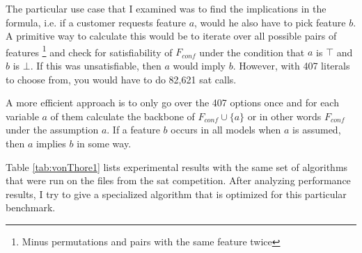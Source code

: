 The particular use case that I examined was to find the implications in the formula, i.e. if a customer requests feature $a$, would he also have to pick feature $b$. A primitive way to calculate this would be to iterate over all possible pairs of features \footnote{Minus permutations and pairs with the same feature twice} and check for satisfiability of $F_{conf}$ under the condition that $a$ is $\top$ and $b$ is $\bot$. If this was unsatisfiable, then $a$ would imply $b$. However, with 407 literals to choose from, you would have to do 82,621 sat calls. 

A more efficient approach is to only go over the 407 options once and for each variable $a$ of them calculate the backbone of $F_{conf} \cup \{a\}$ or in other words $F_{conf}$ under the assumption $a$. If a feature $b$ occurs in all models when $a$ is assumed, then $a$ implies $b$ in some way.

Table \ref{tab:vonThore1} lists experimental results with the same set of algorithms that were run on the files from the sat competition. After analyzing performance results, I try to give a specialized algorithm that is optimized for this particular benchmark.

